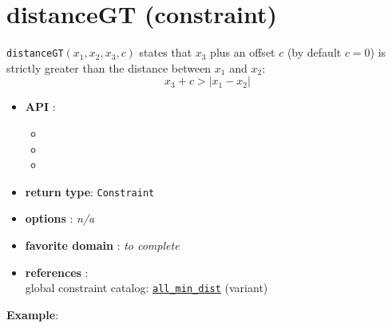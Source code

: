 \label{distancegt}
\hypertarget{distancegt}{}

\section{distanceGT (constraint)}\label{distancegt:distancegtconstraint}\hypertarget{distancegt:distancegtconstraint}{}
\begin{notedef}
  \texttt{distanceGT}$(x_1,x_2,x_3,c)$ states that $x_3$ plus an offset $c$ (by default $c=0$) is strictly greater than the distance between $x_1$ and $x_2$:
$$ x_3 + c > | x_1 - x_2 |$$
\end{notedef}

\begin{itemize}
	\item \textbf{API} :
	\begin{itemize}
		\item {}
		\item {}
		\item {}
	\end{itemize}
	\item \textbf{return type}: \texttt{Constraint}
	\item \textbf{options} : \emph{n/a}
	\item \textbf{favorite domain} : \emph{to complete}
	\item \textbf{references} :\\
      global constraint catalog: \href{http://www.emn.fr/x-info/sdemasse/gccat/Call_min_dist.html}{\tt all\_min\_dist} (variant)
\end{itemize}

\textbf{Example}:

